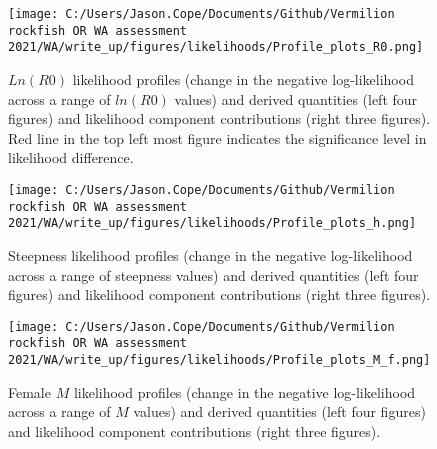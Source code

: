 \documentclass[11pt,
  english,
  a4paper,
]{article}
\begin{document}
\begin{figure}
\centering
\texttt{[image: C:/Users/Jason.Cope/Documents/Github/Vermilion rockfish OR WA assessment 2021/WA/write\_up/figures/likelihoods/Profile\_plots\_R0.png]}
\caption{{\(Ln(R0)\)\leavevmode\tagmcend\tagstructend} likelihood profiles (change in the negative log-likelihood across a range of {\(ln(R0)\)\leavevmode\tagmcend\tagstructend} values) and derived quantities (left four figures) and likelihood component contributions (right three figures). Red line in the top left most figure indicates the significance level in likelihood difference.\label{fig:r0-profile-combo}}
\end{figure}

\tagmcend\tagstructend


\begin{figure}
\centering
\texttt{[image: C:/Users/Jason.Cope/Documents/Github/Vermilion rockfish OR WA assessment 2021/WA/write\_up/figures/likelihoods/Profile\_plots\_h.png]}
\caption{Steepness likelihood profiles (change in the negative log-likelihood across a range of steepness values) and derived quantities (left four figures) and likelihood component contributions (right three figures).\label{fig:steepness-profile-combo}}
\end{figure}

\tagmcend\tagstructend


\begin{figure}
\centering
\texttt{[image: C:/Users/Jason.Cope/Documents/Github/Vermilion rockfish OR WA assessment 2021/WA/write\_up/figures/likelihoods/Profile\_plots\_M\_f.png]}
\caption{Female {\(M\)\leavevmode\tagmcend\tagstructend} likelihood profiles (change in the negative log-likelihood across a range of {\(M\)\leavevmode\tagmcend\tagstructend} values) and derived quantities (left four figures) and likelihood component contributions (right three figures).\label{fig:M_f-profile-combo}}
\end{figure}
\end{document}
